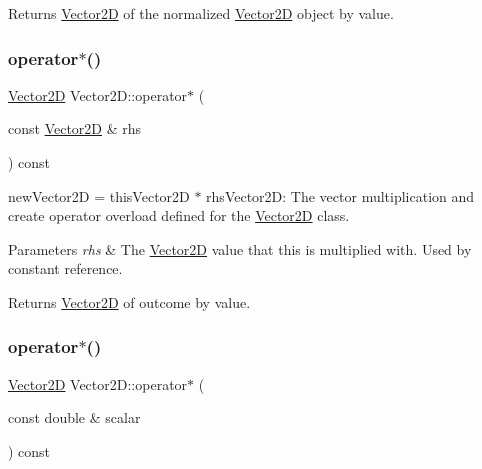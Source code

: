 \begin{DoxyReturn}{Returns}
\hyperlink{class_vector2_d}{Vector2D} of the normalized \hyperlink{class_vector2_d}{Vector2D} object by value. 
\end{DoxyReturn}
\mbox{\label{class_vector2_d_a257aa1ca3260a4cacaa1171f67bf7910}} 
\subsubsection{\texorpdfstring{operator$\ast$()}{operator*()}\hspace{0.1cm}{\footnotesize\ttfamily [1/2]}}
{\footnotesize\ttfamily \hyperlink{class_vector2_d}{Vector2D} Vector2\+D\+::operator$\ast$ (\begin{DoxyParamCaption}\item[{const \hyperlink{class_vector2_d}{Vector2D} \&}]{rhs }\end{DoxyParamCaption}) const}



new\+Vector2D = this\+Vector2D $\ast$ rhs\+Vector2D\+: The vector multiplication and create operator overload defined for the \hyperlink{class_vector2_d}{Vector2D} class. 


\begin{DoxyParams}{Parameters}
{\em rhs} & The \hyperlink{class_vector2_d}{Vector2D} value that this is multiplied with. Used by constant reference. \\
\hline
\end{DoxyParams}
\begin{DoxyReturn}{Returns}
\hyperlink{class_vector2_d}{Vector2D} of outcome by value. 
\end{DoxyReturn}
\mbox{\label{class_vector2_d_a7ade542889c8e483b5cc536b2bf4f053}} 
\subsubsection{\texorpdfstring{operator$\ast$()}{operator*()}\hspace{0.1cm}{\footnotesize\ttfamily [2/2]}}
{\footnotesize\ttfamily \hyperlink{class_vector2_d}{Vector2D} Vector2\+D\+::operator$\ast$ (\begin{DoxyParamCaption}\item[{const double \&}]{scalar }\end{DoxyParamCaption}) const}



